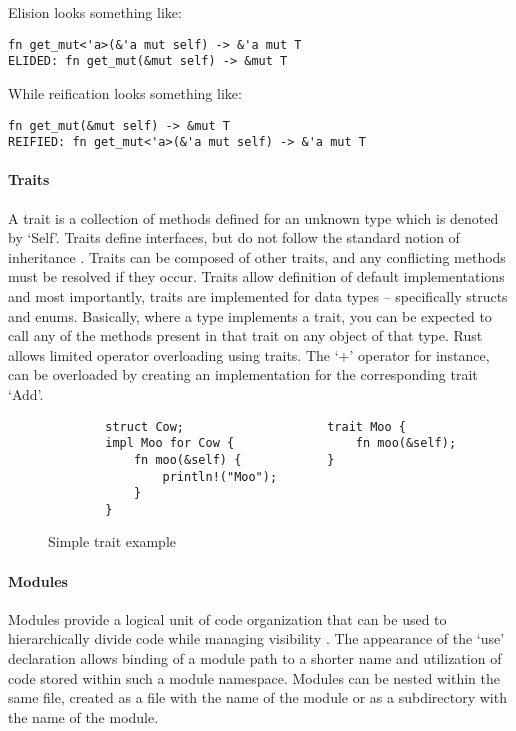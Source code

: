 \vspace{5mm}
Elision looks something like:
\begin{verbatim}
fn get_mut<'a>(&'a mut self) -> &'a mut T
ELIDED: fn get_mut(&mut self) -> &mut T
\end{verbatim}

While reification looks something like:
\begin{verbatim}
fn get_mut(&mut self) -> &mut T
REIFIED: fn get_mut<'a>(&'a mut self) -> &'a mut T
\end{verbatim}

\paragraph{Traits}
A trait is a collection of methods defined for an unknown type which is denoted by `Self'. Traits define interfaces, but do not follow the standard notion of inheritance \cite{traitexample15}. Traits can be composed of other traits, and any conflicting methods must be resolved if they occur. Traits allow definition of default implementations and most importantly, traits are implemented for data types -- specifically structs and enums. Basically, where a type implements a trait, you can be expected to call any of the methods present in that trait on any object of that type. Rust allows limited operator overloading using traits. The `+' operator for instance, can be overloaded by creating an implementation for the corresponding trait `Add'.

\begin{figure}[H]
\centering
\begin{verbatim}
        struct Cow;                    trait Moo {
        impl Moo for Cow {                 fn moo(&self);    
            fn moo(&self) {            }
                println!("Moo");                     
            }
        }
\end{verbatim}
\caption{Simple trait example}
\end{figure}

\paragraph{Modules}
Modules provide a logical unit of code organization that can be used to hierarchically divide code while managing visibility \cite{docmod15}. The appearance of the `use' declaration allows binding of a module path to a shorter name and utilization of code stored within such a module namespace. Modules can be nested within the same file, created as a file with the name of the module or as a subdirectory with the name of the module.

